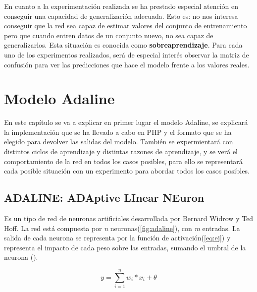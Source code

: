 \documentclass[11pt,spanish,listoffigures,listoftables]{workluis}
\begin{document}
\par En cuanto a la experimentación realizada se ha prestado especial atención en conseguir una capacidad de generalización adecuada. Esto es: no nos interesa conseguir que la red sea capaz de estimar valores del conjunto de entrenamiento pero que cuando entren datos de un conjunto nuevo, no sea capaz de generalizarlos. Esta situación es conocida como \textbf{sobreaprendizaje}. Para cada uno de los experimentos realizados, será de especial interés observar la matriz de confusión para ver las predicciones que hace el modelo frente a los valores reales.
















\chapter{Modelo Adaline}

\par En este capítulo se va a explicar en primer lugar el modelo Adaline, se explicará la implementación que se ha llevado a cabo en PHP y el formato que se ha elegido para devolver las salidas del modelo. También se expermientará con distintos ciclos de aprendizaje y distintas razones de aprendizaje, y se verá el comportamiento de la red en todos los casos posibles, para ello se representará cada posible situación con un experimento para abordar todos los casos posibles.

\section{ADALINE: ADAptive LInear NEuron}

\par Es un tipo de red de neuronas artificiales desarrollada por Bernard Widrow y Ted Hoff. La red está compuesta por \textit{n} neuronas(\ref{fig:adaline}), con \textit{m} entradas. La salida de cada neurona se representa por la función de activación(\ref{eq:ej}) y representa el impacto de cada peso sobre las entradas, sumando el umbral de la neurona (\theta).

\begin{equation}\label{eq:ej}
y = \sum_{i=1}^{n}w_{i}*x_{i} + \theta
\end{equation}
\end{document}

